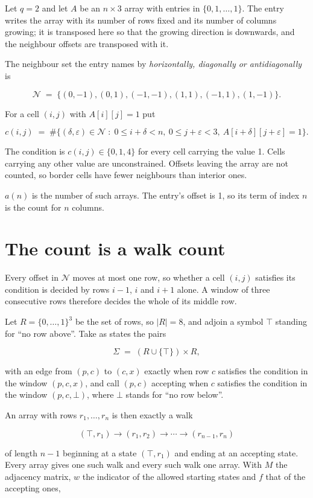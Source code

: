 \documentclass[11pt]{article}
\theoremstyle{definition}
\begin{document}
Let $q = 2$ and let $A$ be an $n \times 3$ array with entries in $\{0,1,\dots,1\}$. The entry writes the array with its number of rows fixed and its number of columns growing; it is transposed here so that the growing direction is downwards, and the neighbour offsets are transposed with it.

The neighbour set the entry names by {\itshape horizontally, diagonally or antidiagonally} is

\[\mathcal{N} \;=\; \{(0,-1), (0,1), (-1,-1), (1,1), (-1,1), (1,-1)\}.\]

For a cell $(i,j)$ with $A[i][j] = 1$ put

\[c(i,j) \;=\; \#\bigl\{(\delta,\varepsilon)\in\mathcal{N} \;:\; 0\le i+\delta<n,\ 0\le j+\varepsilon<3,\ A[i+\delta][j+\varepsilon] = 1\bigr\}.\]

The condition is $c(i,j) \in \{0, 1, 4\}$ for every cell carrying the value 1. Cells carrying any other value are unconstrained. Offsets leaving the array are not counted, so border cells have fewer neighbours than interior ones.

$a(n)$ is the number of such arrays. The entry's offset is 1, so its term of index $n$ is the count for $n$ columns.

\section{The count is a walk count}

Every offset in $\mathcal{N}$ moves at most one row, so whether a cell $(i,j)$ satisfies its condition is decided by rows $i-1$, $i$ and $i+1$ alone. A window of three consecutive rows therefore decides the whole of its middle row.

Let $R = \{0,\dots,1\}^{3}$ be the set of rows, so $|R| = 8$, and adjoin a symbol $\top$ standing for ``no row above''. Take as states the pairs

\[\Sigma \;=\; (R \cup \{\top\}) \times R,\]

with an edge from $(p,c)$ to $(c,x)$ exactly when row $c$ satisfies the condition in the window $(p,c,x)$, and call $(p,c)$ accepting when $c$ satisfies the condition in the window $(p,c,\bot)$, where $\bot$ stands for ``no row below''.

An array with rows $r_1,\dots,r_n$ is then exactly a walk

\[(\top,r_1) \to (r_1,r_2) \to \cdots \to (r_{n-1},r_n)\]

of length $n-1$ beginning at a state $(\top,r_1)$ and ending at an accepting state. Every array gives one such walk and every such walk one array. With $M$ the adjacency matrix, $w$ the indicator of the allowed starting states and $f$ that of the accepting ones,
\end{document}
